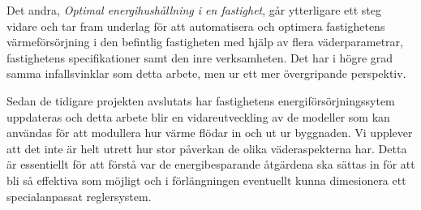 Det andra, \textit{Optimal energihushållning i en fastighet}\cite{kandidatarbete2010}, går ytterligare ett steg vidare och tar fram underlag för att automatisera och optimera fastighetens värmeförsörjning i den befintlig fastigheten med hjälp av flera väderparametrar, fastighetens specifikationer samt den inre verksamheten. Det har i högre grad samma infallsvinklar som detta arbete, men ur ett mer övergripande perspektiv.

Sedan de tidigare projekten avslutats har fastighetens energiförsörjningssytem uppdateras och detta arbete blir en vidareutveckling av de modeller som kan användas för att modullera hur värme flödar in och ut ur byggnaden. Vi upplever att det inte är helt utrett hur stor påverkan de olika väderaspekterna har. Detta är essentiellt för att förstå var de energibesparande åtgärdena ska sättas in för att bli så effektiva som möjligt och i förlängningen eventuellt kunna dimesionera ett specialanpassat reglersystem.






